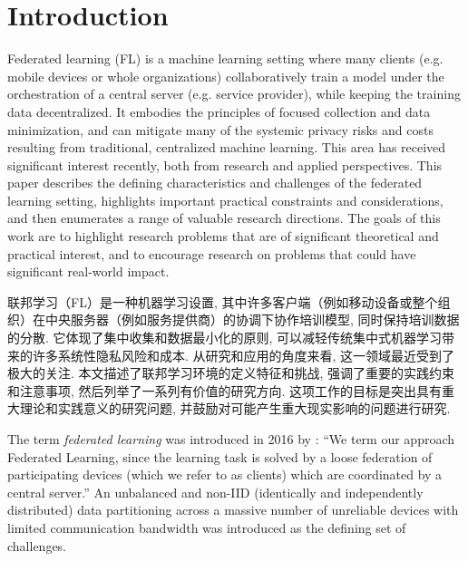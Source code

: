 \section{Introduction}
\label{sec:intro}

Federated learning (FL) is a machine learning setting where many clients (e.g. mobile devices or whole organizations) collaboratively train a model under the orchestration of a central server (e.g. service provider), while keeping the training data decentralized. It embodies the principles of focused collection and data minimization, and can mitigate many of the systemic privacy risks and costs resulting from traditional, centralized machine learning. This area has received significant interest recently, both from research and applied perspectives. This paper describes the defining characteristics and challenges of the federated learning setting, highlights important practical constraints and considerations, and then enumerates a range of valuable research directions. The goals of this work are to highlight research problems that are of significant theoretical and practical interest, and to encourage research on problems that could have significant real-world impact.

联邦学习（FL）是一种机器学习设置, 其中许多客户端（例如移动设备或整个组织）在中央服务器（例如服务提供商）的协调下协作培训模型, 同时保持培训数据的分散. 它体现了集中收集和数据最小化的原则, 可以减轻传统集中式机器学习带来的许多系统性隐私风险和成本. 从研究和应用的角度来看, 这一领域最近受到了极大的关注. 本文描述了联邦学习环境的定义特征和挑战, 强调了重要的实践约束和注意事项, 然后列举了一系列有价值的研究方向. 这项工作的目标是突出具有重大理论和实践意义的研究问题, 并鼓励对可能产生重大现实影响的问题进行研究. 

The term \emph{federated learning} was introduced in 2016 by \citet{mcmahan17fedavg}: ``We term our approach Federated Learning, since the learning task is solved by a loose federation of participating devices (which we refer to as clients) which are coordinated by a central server.''  An unbalanced and non-IID (identically and independently distributed) data partitioning across a massive number of unreliable devices with limited communication bandwidth was introduced as the defining set of challenges.

